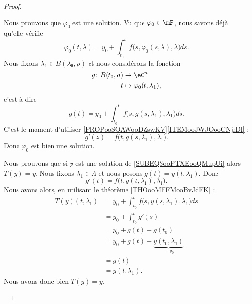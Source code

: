 \begin{proof}
\begin{subproof}
		Nous prouvons que \( \varphi_0\) est une solution. Vu que \( \varphi_0\in \mF\), nous savons déjà qu'elle vérifie
		\begin{equation}
			\varphi_0(t,\lambda)=y_0+\int_{t_0}^tf\big( s,\varphi_0(s,\lambda),\lambda \big)ds.
		\end{equation}
		Nous fixons \( \lambda_1\in B(\lambda_0,\rho)\) et nous considérons la fonction
		\begin{equation}
			\begin{aligned}
				g\colon B(t_0,a) & \to \eC^n                       \\
				t                & \mapsto \varphi_0(t,\lambda_1),
			\end{aligned}
		\end{equation}
		c'est-à-dire
		\begin{equation}
			g(t)=y_0+\int_{t_0}^tf\big( s,g(s,\lambda_1),\lambda_1 \big)ds.
		\end{equation}
		C'est le moment d'utiliser \ref{PROPooSOAWooDZswKV}\ref{ITEMooJWJOooCNjrDl} :
		\begin{equation}
			g'(z)=f\big( t,g(s,\lambda_1),\lambda_1 \big).
		\end{equation}
		Donc \( \varphi_0\) est bien une solution.

		Nous prouvons que si \( y\) est une solution de \eqref{SUBEQSooPTXEooQMupUi} alors \( T(y)=y\). Nous fixons \( \lambda_1\in\Lambda\) et nous posons \( g(t)=y(t,\lambda_1)\). Donc
		\begin{equation}
			g'(t)=f\big( t,y(t,\lambda_1),\lambda_1 \big).
		\end{equation}
		Nous avons alors, en utilisant le théorème \ref{THOooMFFMooBvJdFK} :
		\begin{subequations}
			\begin{align}
				T(y)(t,\lambda_1) & =y_0+\int_{t_0}^tf\big( s,y(s,\lambda_1),\lambda_1 \big)ds \\
				                  & =y_0+\int_{t_0}^tg'(s)                                     \\
				                  & =y_0+g(t)-g(t_0)                                           \\
				                  & =y_0+g(t)-\underbrace{y(t_0,\lambda_1)}_{=y_0}             \\
				                  & =g(t)                                                      \\
				                  & =y(t,\lambda_1).
			\end{align}
		\end{subequations}
		Nous avons donc bien \( T(y)=y\).
	\end{subproof}
\end{proof}


